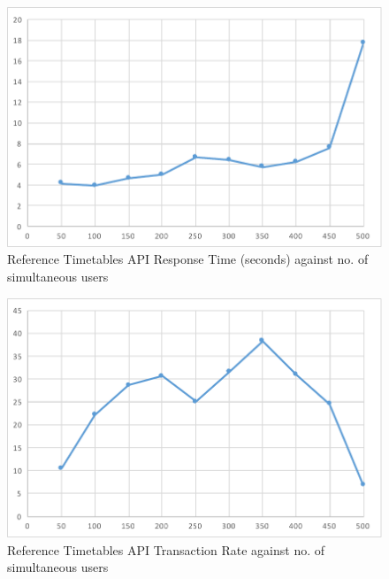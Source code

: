 \begin{figure}
\centering
\includegraphics[width=\textwidth]{figures/siege_tfl_response_time_against_users.pdf}
\caption{\label{fig:siege_tfl_api_response_time} Reference Timetables API Response Time (seconds) against no. of simultaneous users}
\end{figure}

\begin{figure}
\centering
\includegraphics[width=\textwidth]{figures/siege_tfl_transfer_rate_against_users.pdf}
\caption{\label{fig:siege_tfl_api_transfer_rate} Reference Timetables API Transaction Rate against no. of simultaneous users}
\end{figure}


